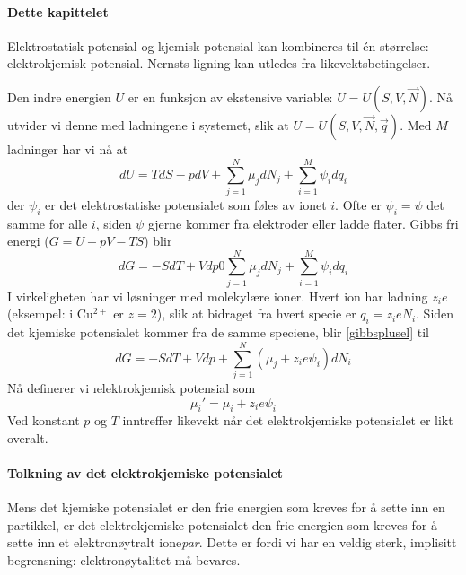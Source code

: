\paragraph{Dette kapittelet}
Elektrostatisk potensial og kjemisk potensial kan kombineres til én størrelse: elektrokjemisk potensial. Nernsts ligning kan utledes fra likevektsbetingelser. 


Den indre energien $U$ er en funksjon av ekstensive variable: $U=U(S,V,\vec{N})$. Nå utvider vi denne med ladningene i systemet, slik at $U=U(S,V,\vec{N},\vec{q})$. Med $M$ ladninger har vi nå at
\begin{equation}
	dU=TdS-pdV+\sum_{j=1}^{N}\mu_jdN_j+\sum_{i=1}^{M}\psi_idq_i
\end{equation}
der $\psi_i$ er det elektrostatiske potensialet som føles av ionet $i$. Ofte er $\psi_i=\psi$ det samme for alle $i$, siden $\psi$ gjerne kommer fra elektroder eller ladde flater.
Gibbs fri energi ($G=U+pV-TS$) blir
\begin{equation}
	\label{gibbsplusel}
	dG=-SdT+Vdp0\sum_{j=1}^N\mu_jdN_j+\sum_{i=1}^M\psi_idq_i
\end{equation}
I virkeligheten har vi løsninger med molekylære ioner. Hvert ion har ladning $z_ie$ (eksempel: i Cu$^{2+}$ er $z=2$), slik at bidraget fra hvert specie er $q_i=z_ieN_i$. Siden det kjemiske potensialet kommer fra de samme speciene, blir \eqref{gibbsplusel} til
\begin{equation}
	dG=-SdT+Vdp+\sum_{j=1}^N(\mu_j+z_ie\psi_i)dN_i
\end{equation}
Nå definerer vi \i{elektrokjemisk potensial} som
\begin{equation}
	\mu_i'=\mu_i+z_ie\psi_i
\end{equation}
Ved konstant $p$ og $T$ inntreffer likevekt når det elektrokjemiske potensialet er likt overalt.

\paragraph{Tolkning av det elektrokjemiske potensialet}
Mens det kjemiske potensialet er den frie energien som kreves for å sette inn en partikkel, er det elektrokjemiske potensialet den frie energien som kreves for å sette inn et elektronøytralt ione\emph{par}. Dette er fordi vi har en veldig sterk, implisitt begrensning: elektronøytalitet må bevares.

